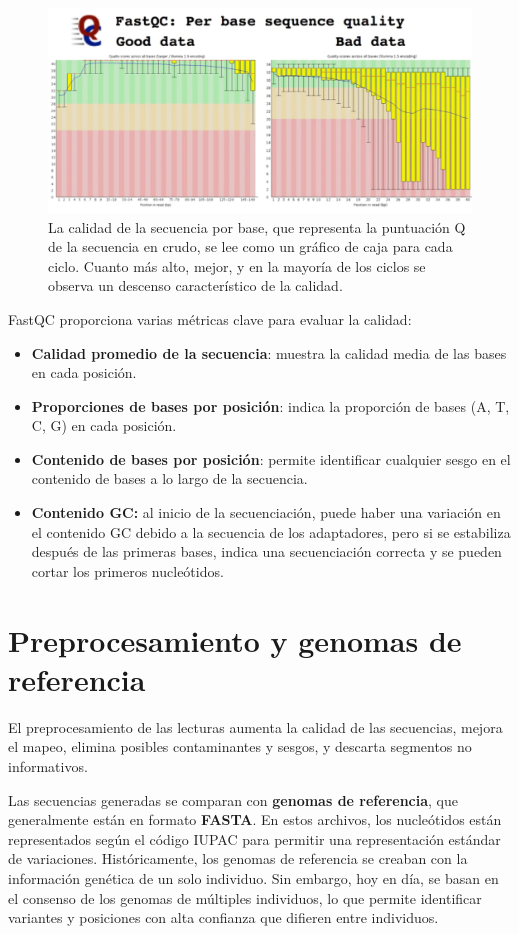 \begin{itemize}
\begin{figure}[htbp]
\centering
\includegraphics[width = \textwidth]{figs/good-bad-fastq.png}
\caption{La calidad de la secuencia por base, que representa la puntuación Q de la secuencia en crudo, se lee como un gráfico de caja para cada ciclo. Cuanto más alto, mejor, y en la mayoría de los ciclos se observa un descenso característico de la calidad.}
\end{figure}

FastQC proporciona varias métricas clave para evaluar la calidad: 
\begin{itemize} 
\item \textbf{Calidad promedio de la secuencia}: muestra la calidad media de las bases en cada posición. 
\item \textbf{Proporciones de bases por posición}: indica la proporción de bases (A, T, C, G) en cada posición. 
\item \textbf{Contenido de bases por posición}: permite identificar cualquier sesgo en el contenido de bases a lo largo de la secuencia. 
\item \textbf{Contenido GC:} al inicio de la secuenciación, puede haber una variación en el contenido GC debido a la secuencia de los adaptadores, pero si se estabiliza después de las primeras bases, indica una secuenciación correcta y se pueden cortar los primeros nucleótidos. 
\end{itemize}

\section{Preprocesamiento y genomas de referencia} 
El preprocesamiento de las lecturas aumenta la calidad de las secuencias, mejora el mapeo, elimina posibles contaminantes y sesgos, y descarta segmentos no informativos.

Las secuencias generadas se comparan con \textbf{genomas de referencia}, que generalmente están en formato \textbf{FASTA}. En estos archivos, los nucleótidos están representados según el código IUPAC para permitir una representación estándar de variaciones. Históricamente, los genomas de referencia se creaban con la información genética de un solo individuo. Sin embargo, hoy en día, se basan en el consenso de los genomas de múltiples individuos, lo que permite identificar variantes y posiciones con alta confianza que difieren entre individuos.


\end{itemize}
